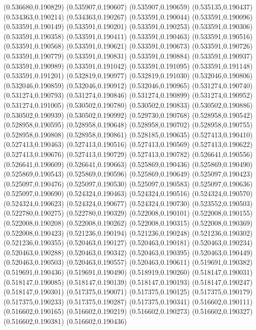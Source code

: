 (0.536680,0.190829)
(0.535907,0.190607)
(0.535907,0.190659)
(0.535135,0.190437)
(0.534363,0.190214)
(0.534363,0.190267)
(0.533591,0.190044)
(0.533591,0.190096)
(0.533591,0.190149)
(0.533591,0.190201)
(0.533591,0.190253)
(0.533591,0.190306)
(0.533591,0.190358)
(0.533591,0.190411)
(0.533591,0.190463)
(0.533591,0.190516)
(0.533591,0.190568)
(0.533591,0.190621)
(0.533591,0.190673)
(0.533591,0.190726)
(0.533591,0.190779)
(0.533591,0.190831)
(0.533591,0.190884)
(0.533591,0.190937)
(0.533591,0.190989)
(0.533591,0.191042)
(0.533591,0.191095)
(0.533591,0.191148)
(0.533591,0.191201)
(0.532819,0.190977)
(0.532819,0.191030)
(0.532046,0.190806)
(0.532046,0.190859)
(0.532046,0.190912)
(0.532046,0.190965)
(0.531274,0.190740)
(0.531274,0.190793)
(0.531274,0.190846)
(0.531274,0.190899)
(0.531274,0.190952)
(0.531274,0.191005)
(0.530502,0.190780)
(0.530502,0.190833)
(0.530502,0.190886)
(0.530502,0.190939)
(0.530502,0.190992)
(0.529730,0.190768)
(0.528958,0.190542)
(0.528958,0.190595)
(0.528958,0.190648)
(0.528958,0.190702)
(0.528958,0.190755)
(0.528958,0.190808)
(0.528958,0.190861)
(0.528185,0.190635)
(0.527413,0.190410)
(0.527413,0.190463)
(0.527413,0.190516)
(0.527413,0.190569)
(0.527413,0.190622)
(0.527413,0.190676)
(0.527413,0.190729)
(0.527413,0.190782)
(0.526641,0.190556)
(0.526641,0.190609)
(0.526641,0.190663)
(0.525869,0.190436)
(0.525869,0.190490)
(0.525869,0.190543)
(0.525869,0.190596)
(0.525869,0.190649)
(0.525097,0.190423)
(0.525097,0.190476)
(0.525097,0.190530)
(0.525097,0.190583)
(0.525097,0.190636)
(0.525097,0.190690)
(0.524324,0.190463)
(0.524324,0.190516)
(0.524324,0.190570)
(0.524324,0.190623)
(0.524324,0.190677)
(0.524324,0.190730)
(0.523552,0.190503)
(0.522780,0.190275)
(0.522780,0.190329)
(0.522008,0.190101)
(0.522008,0.190155)
(0.522008,0.190208)
(0.522008,0.190262)
(0.522008,0.190315)
(0.522008,0.190369)
(0.522008,0.190423)
(0.521236,0.190194)
(0.521236,0.190248)
(0.521236,0.190302)
(0.521236,0.190355)
(0.520463,0.190127)
(0.520463,0.190181)
(0.520463,0.190234)
(0.520463,0.190288)
(0.520463,0.190342)
(0.520463,0.190395)
(0.520463,0.190449)
(0.520463,0.190503)
(0.520463,0.190557)
(0.520463,0.190611)
(0.519691,0.190382)
(0.519691,0.190436)
(0.519691,0.190490)
(0.518919,0.190260)
(0.518147,0.190031)
(0.518147,0.190085)
(0.518147,0.190139)
(0.518147,0.190193)
(0.518147,0.190247)
(0.518147,0.190301)
(0.517375,0.190071)
(0.517375,0.190125)
(0.517375,0.190179)
(0.517375,0.190233)
(0.517375,0.190287)
(0.517375,0.190341)
(0.516602,0.190111)
(0.516602,0.190165)
(0.516602,0.190219)
(0.516602,0.190273)
(0.516602,0.190327)
(0.516602,0.190381)
(0.516602,0.190436)
